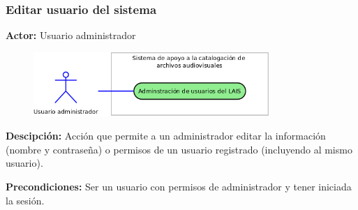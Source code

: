 \documentclass[10pt,letterpaper]{article}
\begin{document}
\subsubsection{Editar usuario del sistema}
\textbf{Actor:} Usuario administrador

\begin{figure}[H]
	\centering
	\includegraphics[width=0.8\textwidth]{CasoDeUso_Administrador_AdministracionDeUsuarios.png}
\end{figure}

\textbf{Descipción: } Acción que permite a un administrador editar la información (nombre y contraseña) o permisos de un usuario registrado (incluyendo al mismo usuario).

\textbf{Precondiciones:} Ser un usuario con permisos de administrador y tener iniciada la sesión.
\end{document}
